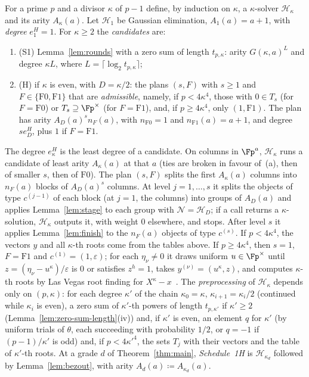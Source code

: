 \begin{definition}[Schedule~1H]
\label{def:schedule1h}
For a prime $p$ and a divisor $\kappa$ of $p-1$ define, by induction on $\kappa$, a $\kappa$-solver $\mathcal H_\kappa$ and its arity $A_\kappa(a)$. Let $\mathcal H_1$ be Gaussian elimination, $A_1(a) = a+1$, with \emph{degree} $e^H_1 = 1$. For $\kappa \ge 2$ the \emph{candidates} are:
\begin{enumerate}[label=\textup{(\alph*)},leftmargin=2em]
  \item \textup{(S1)} Lemma~\ref{lem:rounds} with a zero sum of length $t_{p,\kappa}$: arity $G(\kappa,a)^L$ and degree $\kappa L$, where $L = \lceil\log_2 t_{p,\kappa}\rceil$;
  \item \textup{(H)} if $\kappa$ is even, with $D = \kappa/2$: the plans $(s,F)$ with $s \ge 1$ and $F \in \{\mathrm{F0},\mathrm{F1}\}$ that are \emph{admissible}, namely, if $p < 4\kappa^4$, those with $0 \in T_s$ (for $F = \mathrm{F0}$) or $T_s \supseteq \Fp^\times$ (for $F = \mathrm{F1}$), and, if $p \ge 4\kappa^4$, only $(1,\mathrm{F1})$. The plan has arity $A_D(a)^s n_F(a)$, with $n_{\mathrm{F0}} = 1$ and $n_{\mathrm{F1}}(a) = a+1$, and degree $se^H_D$, plus $1$ if $F = \mathrm{F1}$.
\end{enumerate}
The degree $e^H_\kappa$ is the least degree of a candidate. On columns in $\Fp^a$, $\mathcal H_\kappa$ runs a candidate of least arity $A_\kappa(a)$ at that $a$ (ties are broken in favour of~(a), then of smaller $s$, then of $\mathrm{F0}$). The plan $(s,F)$ splits the first $A_\kappa(a)$ columns into $n_F(a)$ blocks of $A_D(a)^s$ columns. At level $j = 1,\dots,s$ it splits the objects of type $c^{(j-1)}$ of each block (at $j = 1$, the columns) into groups of $A_D(a)$ and applies Lemma~\ref{lem:stage} to each group with $\mathcal N = \mathcal H_D$; if a call returns a $\kappa$-solution, $\mathcal H_\kappa$ outputs it, with weight $0$ elsewhere, and stops. After level $s$ it applies Lemma~\ref{lem:finish} to the $n_F(a)$ objects of type $c^{(s)}$. If $p < 4\kappa^4$, the vectors $y$ and all $\kappa$-th roots come from the tables above. If $p \ge 4\kappa^4$, then $s = 1$, $F = \mathrm{F1}$ and $c^{(1)} = (1,\varepsilon)$; for each $\eta_\nu \ne 0$ it draws uniform $u \in \Fp^\times$ until $z = (\eta_\nu - u^\kappa)/\varepsilon$ is $0$ or satisfies $z^h = 1$, takes $y^{(\nu)} = (u^\kappa, z)$, and computes $\kappa$-th roots by Las Vegas root finding for $X^\kappa - x$~\cite{Rabin1980}.
The \emph{preprocessing} of $\mathcal H_\kappa$ depends only on $(p,\kappa)$: for each degree $\kappa'$ of the chain $\kappa_0 = \kappa$, $\kappa_{i+1} = \kappa_i/2$ (continued while $\kappa_i$ is even), a zero sum of $\kappa'$-th powers of length $t_{p,\kappa'}$ if $\kappa' \ge 2$ (Lemma~\ref{lem:zero-sum-length}(iv)) and, if $\kappa'$ is even, an element $q$ for $\kappa'$ (by uniform trials of $\theta$, each succeeding with probability $1/2$, or $q = -1$ if $(p-1)/\kappa'$ is odd) and, if $p < 4\kappa'^4$, the sets $T_j$ with their vectors and the table of $\kappa'$-th roots. At a grade $d$ of Theorem~\ref{thm:main}, \emph{Schedule~1H} is $\mathcal H_{\kappa_d}$ followed by Lemma~\ref{lem:bezout}, with arity $A_d(a) \coloneqq A_{\kappa_d}(a)$.
\end{definition}


